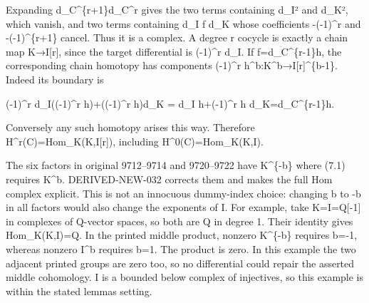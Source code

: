 Expanding d\_\allowbreak{}C\textasciicircum{}\{r\allowbreak{}+1\}d\_\allowbreak{}C\textasciicircum{}r gives the two terms containing d\_\allowbreak{}I² and d\_\allowbreak{}K²,\allowbreak{} which vanish,\allowbreak{} and two terms containing d\_\allowbreak{}I f d\_\allowbreak{}K whose coefficients -(-1)\allowbreak{}\textasciicircum{}r and -(-1)\allowbreak{}\textasciicircum{}\{r\allowbreak{}+1\} cancel. Thus it is a complex. A degree r cocycle is exactly a chain map K\allowbreak{}→I[r]\allowbreak{},\allowbreak{} since the target differential is (-1)\allowbreak{}\textasciicircum{}r d\_\allowbreak{}I. If f\allowbreak{}=d\_\allowbreak{}C\textasciicircum{}\{r-1\}h,\allowbreak{} the corresponding chain homotopy has components (-1)\allowbreak{}\textasciicircum{}r h\textasciicircum{}b:\allowbreak{}K\textasciicircum{}b\allowbreak{}→I[r]\allowbreak{}\textasciicircum{}\{b-1\}. Indeed its boundary is

(-1)\allowbreak{}\textasciicircum{}r d\_\allowbreak{}I((-1)\allowbreak{}\textasciicircum{}r h)\allowbreak{}\allowbreak{}+((-1)\allowbreak{}\textasciicircum{}r h)\allowbreak{}d\_\allowbreak{}K \allowbreak{}= d\_\allowbreak{}I h\allowbreak{}+(-1)\allowbreak{}\textasciicircum{}r h d\_\allowbreak{}K\allowbreak{}=d\_\allowbreak{}C\textasciicircum{}\{r-1\}h.

Conversely any such homotopy arises this way. Therefore H\textasciicircum{}r(C)\allowbreak{}\allowbreak{}=Hom\_\allowbreak{}K(K,\allowbreak{}I[r]\allowbreak{})\allowbreak{},\allowbreak{} including H\textasciicircum{}0(C)\allowbreak{}\allowbreak{}=Hom\_\allowbreak{}K(K,\allowbreak{}I)\allowbreak{}.

The six factors in original 9712–\allowbreak{}9714 and 9720–\allowbreak{}9722 have K\^{}\{-b\} where (7.1)\allowbreak{} requires K\^{}b. DERIVED-NEW-032 corrects them and makes the full Hom complex explicit. This is not an innocuous dummy-index choice:\allowbreak{} changing b to -b in all factors would also change the exponents of I. For example,\allowbreak{} take K\allowbreak{}=I\allowbreak{}=Q[-1]\allowbreak{} in complexes of Q-vector spaces,\allowbreak{} so both are Q in degree 1. Their identity gives Hom\_\allowbreak{}K(K,\allowbreak{}I)\allowbreak{}\allowbreak{}=Q. In the printed middle product,\allowbreak{} nonzero K\^{}\{-b\} requires b\allowbreak{}=-1,\allowbreak{} whereas nonzero I\^{}b requires b\allowbreak{}=1. The product is zero. In this example the two adjacent printed groups are zero too,\allowbreak{} so no differential could repair the asserted middle cohomology. I is a bounded below complex of injectives,\allowbreak{} so this example is within the stated lemma\textquotesingle s setting.

